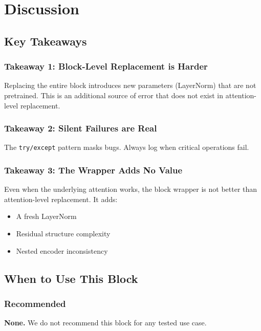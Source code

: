 
\section{Discussion}

\subsection{Key Takeaways}

\subsubsection{Takeaway 1: Block-Level Replacement is Harder}

Replacing the entire block introduces new parameters (LayerNorm) that are 
not pretrained. This is an additional source of error that does not exist 
in attention-level replacement.

\subsubsection{Takeaway 2: Silent Failures are Real}

The \texttt{try/except} pattern masks bugs. Always log when critical operations 
fail.

\subsubsection{Takeaway 3: The Wrapper Adds No Value}

Even when the underlying attention works, the block wrapper is not better 
than attention-level replacement. It adds:
\begin{itemize}
\item A fresh LayerNorm
\item Residual structure complexity
\item Nested encoder inconsistency

\end{itemize}
\subsection{When to Use This Block}

\subsubsection{Recommended}

\textbf{None.} We do not recommend this block for any tested use case.

